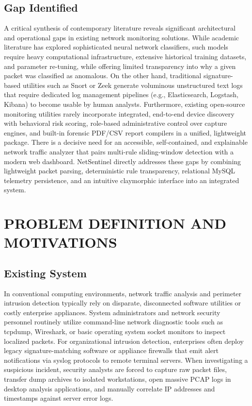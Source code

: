 \documentclass[a4paper,12pt]{report}
\begin{document}
	\section{Gap Identified}
	\par
	A critical synthesis of contemporary literature reveals significant architectural and operational gaps in existing network monitoring solutions. While academic literature has explored sophisticated neural network classifiers, such models require heavy computational infrastructure, extensive historical training datasets, and parameter re-tuning, while offering limited transparency into why a given packet was classified as anomalous. On the other hand, traditional signature-based utilities such as Snort or Zeek generate voluminous unstructured text logs that require dedicated log management pipelines (e.g., Elasticsearch, Logstash, Kibana) to become usable by human analysts. Furthermore, existing open-source monitoring utilities rarely incorporate integrated, end-to-end device discovery with behavioral risk scoring, role-based administrative control over capture engines, and built-in forensic PDF/CSV report compilers in a unified, lightweight package. There is a decisive need for an accessible, self-contained, and explainable network traffic analyzer that pairs multi-rule sliding-window detection with a modern web dashboard. NetSentinel directly addresses these gaps by combining lightweight packet parsing, deterministic rule transparency, relational MySQL telemetry persistence, and an intuitive claymorphic interface into an integrated system.
	
	\chapter{PROBLEM DEFINITION AND MOTIVATIONS}
	
	\section{Existing System}
	\par
	In conventional computing environments, network traffic analysis and perimeter intrusion detection typically rely on disparate, disconnected software utilities or costly enterprise appliances. System administrators and network security personnel routinely utilize command-line network diagnostic tools such as tcpdump, Wireshark, or basic operating system socket monitors to inspect localized packets. For organizational intrusion detection, enterprises often deploy legacy signature-matching software or appliance firewalls that emit alert notifications via syslog protocols to remote terminal servers. When investigating a suspicious incident, security analysts are forced to capture raw packet files, transfer dump archives to isolated workstations, open massive PCAP logs in desktop analysis applications, and manually correlate IP addresses and timestamps against server error logs.
	
\end{document}
